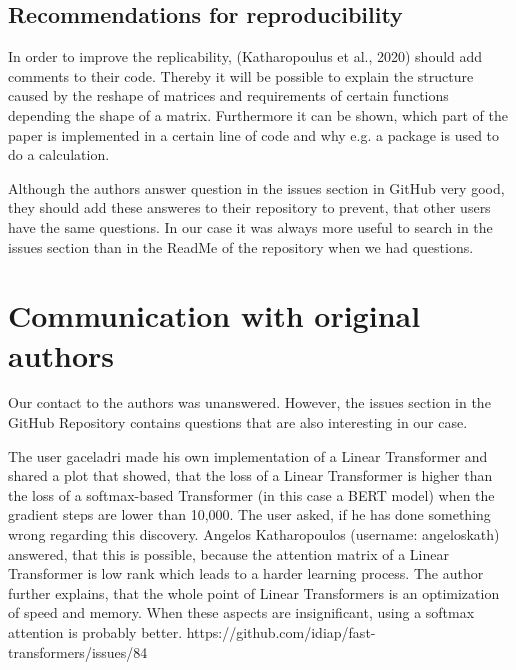 \documentclass[DIV=13,fontsize=11pt]{scrartcl}
\begin{document}


\subsection{Recommendations for reproducibility}
In order to improve the replicability, (Katharopoulus et al., 2020) should add comments to their code. Thereby it will be possible to explain the structure caused by the reshape of matrices and requirements of certain functions depending the shape of a matrix. Furthermore it can be shown, which part of the paper is implemented in a certain line of code and why e.g. a package is used to do a calculation.

Although the authors answer question in the issues section in GitHub very good, they should add these answeres to their repository to prevent, that other users have the same questions. In our case it was always more useful to search in the issues section than in the ReadMe of the repository when we had questions.


\section{Communication with original authors}
Our contact to the authors was unanswered. However, the issues section in the GitHub Repository contains questions that are also interesting in our case.

The user gaceladri made his own implementation of a Linear Transformer and shared a plot that showed, that the loss of a Linear Transformer is higher than the loss of a softmax-based Transformer (in this case a BERT model) when the gradient steps are lower than 10,000.  The user asked, if he has done something wrong regarding this discovery. Angelos Katharopoulos (username: angeloskath) answered, that this is possible, because the attention matrix of a Linear Transformer is low rank which leads to a harder learning process. The author further explains, that the whole point of Linear Transformers is an optimization of speed and memory. When these aspects are insignificant, using a softmax attention is probably better. 
https://github.com/idiap/fast-transformers/issues/84
\end{document}
